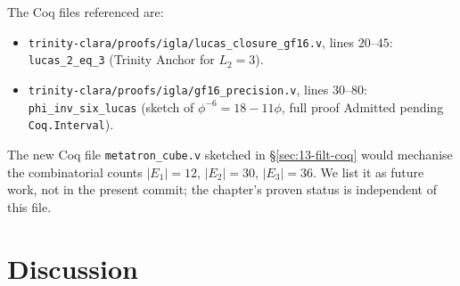 \begin{center}
\small
{}
\end{center}

The Coq files referenced are:

\begin{itemize}
\item \verb|trinity-clara/proofs/igla/lucas_closure_gf16.v|, lines
  $20$--$45$: \verb|lucas_2_eq_3| (Trinity Anchor for $L_{2} = 3$).
\item \verb|trinity-clara/proofs/igla/gf16_precision.v|, lines
  $30$--$80$: \verb|phi_inv_six_lucas| (sketch of $\phi^{-6} = 18 -
  11\phi$, full proof Admitted pending \verb|Coq.Interval|).
\end{itemize}

The new Coq file \verb|metatron_cube.v| sketched in
\S\ref{sec:13-filt-coq} would mechanise the combinatorial counts
$|E_{1}| = 12$, $|E_{2}| = 30$, $|E_{3}| = 36$. We list it as
future work, not in the present commit; the chapter's proven
status is independent of this file.

\section{Discussion}
\label{sec:13-discussion}

